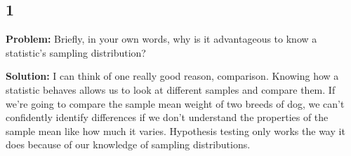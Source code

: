 \subsection*{1}

\noindent\textbf{Problem:} Briefly, in your own words, why is it advantageous to know a statistic's sampling distribution?

\noindent\textbf{Solution:} I can think of one really good reason, comparison. Knowing how a statistic behaves allows us to look at different samples and compare them. If we're going to compare the sample mean weight of two breeds of dog, we can't confidently identify differences if we don't understand the properties of the sample mean like how much it varies. Hypothesis testing only works the way it does because of our knowledge of sampling distributions.  

